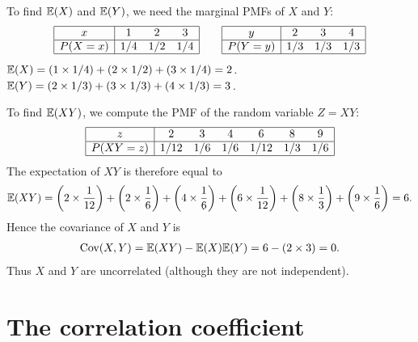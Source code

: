 \begin{solution}
To find $\mathbb{E}(X)$ and $\mathbb{E}(Y)$, we need the marginal PMFs of $X$ and $Y$:
\[\begin{array}{|c|ccc|}\hline
x		& 1		& 2		& 3		\\ \hline
P(X=x)	& 1/4	& 1/2	& 1/4	\\ \hline
\end{array}
\qquad
\begin{array}{|c|ccc|}\hline
y		& 2		& 3		& 4		\\ \hline
P(Y=y)	& 1/3	& 1/3	& 1/3	\\ \hline
\end{array}\]
\bit
\it $\mathbb{E}(X) = \left(1\times 1/4\right) + \left(2\times 1/2\right) + \left(3\times 1/4\right) = 2$.
\it $\mathbb{E}(Y) = \left(2\times 1/3\right) + \left(3\times 1/3\right) + \left(4\times 1/3\right) = 3$.
\eit

To find $\mathbb{E}(XY)$, we compute the PMF of the random variable $Z=XY$:
\[\begin{array}{|c|cccccc|}\hline
z		& 2		& 3		& 4		& 6		& 8		& 9	\\ \hline
P(XY=z)	& 1/12	& 1/6	& 1/6	& 1/12	& 1/3	& 1/6 \\ \hline
\end{array}\]
The expectation of $XY$ is therefore equal to
\[
\mathbb{E}(XY) = \left(2\times\frac{1}{12}\right) + \left(2\times\frac{1}{6}\right) + \left(4\times\frac{1}{6}\right) + \left(6\times\frac{1}{12}\right) + \left(8\times\frac{1}{3}\right) + \left(9\times\frac{1}{6}\right) = 6.
\]
Hence the covariance of $X$ and $Y$ is
\begin{align*}
\text{Cov}(X,Y)
	=\mathbb{E}(XY)-\mathbb{E}(X)\mathbb{E}(Y)
	= 6 - (2\times 3)
	= 0.
\end{align*}
Thus $X$ and $Y$ are uncorrelated (although they are not independent).
\end{solution}

\section{The correlation coefficient}


